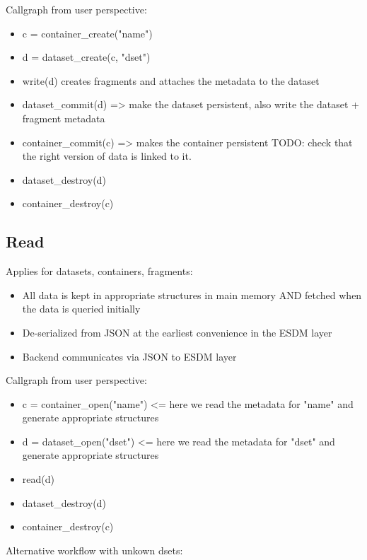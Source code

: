 Callgraph from user perspective:

\begin{itemize}
  \item c = container\_create("name")
  \item d = dataset\_create(c, "dset")
  \item write(d) creates fragments and attaches the metadata to the dataset
  \item dataset\_commit(d) =\textgreater{} make the dataset persistent, also write the dataset + fragment metadata
  \item container\_commit(c) =\textgreater{} makes the container persistent
    TODO: check that the right version of data is linked to it.
  \item dataset\_destroy(d)
  \item container\_destroy(c)
\end{itemize}

\subsection{Read}%
\label{read}

Applies for datasets, containers, fragments:

\begin{itemize}
  \item All data is kept in appropriate structures in main memory AND fetched when the data is queried initially
  \item De-serialized from JSON at the earliest convenience in the ESDM layer
  \item Backend communicates via JSON to ESDM layer
\end{itemize}

Callgraph from user perspective:

\begin{itemize}
  \item c = container\_open("name") \textless= here we read the metadata for "name" and generate appropriate structures
  \item d = dataset\_open("dset") \textless= here we read the metadata for "dset" and generate appropriate structures
  \item read(d)
  \item dataset\_destroy(d)
  \item container\_destroy(c)
\end{itemize}

Alternative workflow with unkown dsets:

